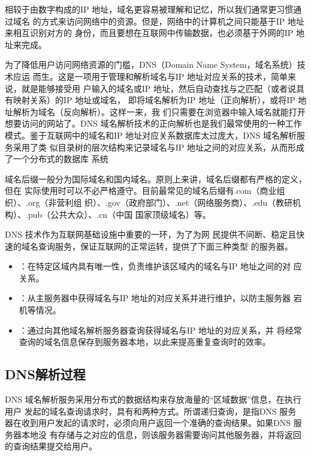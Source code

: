相较于由数字构成的IP 地址，域名更容易被理解和记忆，所以我们通常更习惯通过域名
的方式来访问网络中的资源。但是，网络中的计算机之间只能基于IP 地址来相互识别对方的
身份，而且要想在互联网中传输数据，也必须基于外网的IP 地址来完成。

为了降低用户访问网络资源的门槛，DNS（Domain Name System，域名系统）技术应运
而生。这是一项用于管理和解析域名与IP 地址对应关系的技术，简单来说，就是能够接受用
户输入的域名或IP 地址，然后自动查找与之匹配（或者说具有映射关系）的IP 地址或域名，
即将域名解析为IP 地址（正向解析），或将IP 地址解析为域名（反向解析）。这样一来，我
们只需要在浏览器中输入域名就能打开想要访问的网站了。DNS 域名解析技术的正向解析也是我们最常使用的一种工作模式。鉴于互联网中的域名和IP 地址对应关系数据库太过庞大，DNS 域名解析服务采用了类
似目录树的层次结构来记录域名与IP 地址之间的对应关系，从而形成了一个分布式的数据库
系统

域名后缀一般分为国际域名和国内域名。原则上来讲，域名后缀都有严格的定义，但在
实际使用时可以不必严格遵守。目前最常见的域名后缀有.com（商业组织）、.org（非营利组
织）、.gov（政府部门）、.net（网络服务商）、.edu（教研机构）、.pub（公共大众）、.cn（中国
国家顶级域名）等。

DNS 技术作为互联网基础设施中重要的一环，为了为网
民提供不间断、稳定且快速的域名查询服务，保证互联网的正常运转，提供了下面三种类型
的服务器。

\begin{itemize}
	\item {}：在特定区域内具有唯一性，负责维护该区域内的域名与IP 地址之间的对
	应关系。
	\item {}：从主服务器中获得域名与IP 地址的对应关系并进行维护，以防主服务器
	宕机等情况。
	\item {}：通过向其他域名解析服务器查询获得域名与IP 地址的对应关系，并
	将经常查询的域名信息保存到服务器本地，以此来提高重复查询时的效率。
\end{itemize}

\subsection{DNS解析过程}
DNS 域名解析服务采用分布式的数据结构来存放海量的“区域数据”信息，在执行用户
发起的域名查询请求时，具有和两种方式。所谓递归查询，是指DNS 服务
器在收到用户发起的请求时，必须向用户返回一个准确的查询结果。如果DNS 服务器本地没
有存储与之对应的信息，则该服务器需要询问其他服务器，并将返回的查询结果提交给用户。

